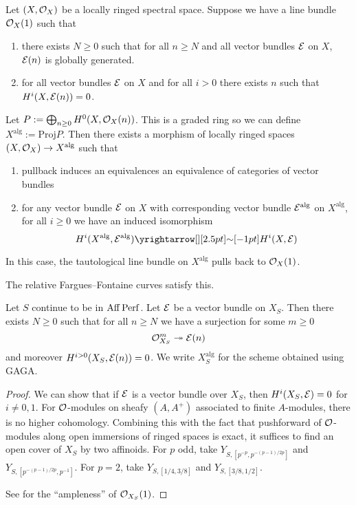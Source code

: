 \documentclass{article}
\begin{document}
\begin{prop}[GAGA]
  
  Let $(X , \mathcal{O}_X)$ be a locally ringed spectral space.
  Suppose we have a line bundle $\mathcal{O}_X(1)$ such that 
  \begin{enumerate}
    \item there exists $N \geq 0$ such that for all $n \geq N$ 
    and all vector bundles $\mathcal{E}$ on $X$, $\mathcal{E}(n)$ is globally generated.
    \item for all vector bundles $\mathcal{E}$ on $X$
    and for all $i > 0$
    there exists $n$ such that $H^i(X , \mathcal{E}(n)) = 0$.
  \end{enumerate}
  Let $P := \bigoplus_{n \geq 0} H^0(X , \mathcal{O}_X(n))$.
  This is a graded ring so we can define 
  $X^{\mathrm{alg}} := \mathrm{Proj} P$.
  Then there exists a morphism of locally ringed spaces
  $(X , \mathcal{O}_X) \to X^{\mathrm{alg}}$ such that 
  \begin{enumerate}
    \item pullback induces an equivalences an equivalence of
    categories of vector bundles
    \item for any vector bundle $\mathcal{E}$ on $X$ with
    corresponding vector bundle $\mathcal{E}^{\mathrm{alg}}$ on $X^{\mathrm{alg}}$,
    for all $i \geq 0$
    we have an induced isomorphism \[
      H^i(X^{\mathrm{alg}}, \cE^{\mathrm{alg}}) \map{\sim}{}
      H^i(X , \cE)
    \]
  \end{enumerate}
  In this case, the tautological line bundle on $X^{\mathrm{alg}}$
  pulls back to $\mathcal{O}_X(1)$.
  \cite[Prop. II.2.7]{FS24}
\end{prop}
The relative Fargues--Fontaine curves satisfy this.
\begin{prop}
  
  Let $S$ continue to be in $\mathrm{Aff}\operatorname{Perf}$.
  Let $\mathcal{E}$ be a vector bundle on $X_S$.
  Then there exists $N \geq 0$ such that for all $n \geq N$
  we have a surjection for some $m \geq 0$
  \[
    \mathcal{O}_{X_S}^m \twoheadrightarrow \mathcal{E}(n)
  \]
  and moreover $H^{i > 0}(X_S , \mathcal{E}(n)) = 0$.
  We write $X_S^{\mathrm{alg}}$ for the scheme
  obtained using GAGA.
\end{prop}
\begin{proof}
  We can show that if $\mathcal{E}$ is a vector bundle over $X_S$,
  then $H^{i}(X_S , \mathcal{E}) = 0$ for $i \neq 0 , 1$.
  For $\mathcal{O}$-modules on sheafy $(A , A^+)$ associated to 
  finite $A$-modules, there is no higher cohomology.
  \cite[Theorem 2.5.20]{KL15}
  Combining this with the fact that pushforward of
  $\mathcal{O}$-modules along open immersions of ringed spaces is exact,
  it suffices to find an open cover of $X_S$ by two affinoids.
  For $p$ odd, take $Y_{S , [p^{-p} , p^{- (p-1) / 2 p}]}$ and 
  $Y_{S , [p^{- (p-1)/2p} , p^{-1}]}$.
  For $p = 2$, take $Y_{S , [1 / 4 , 3 / 8]}$ and $Y_{S , [3 / 8 , 1 / 2]}$.

  See \cite[Theorem II.2.6]{FS24} for the ``ampleness'' of $\mathcal{O}_{X_S}(1)$.
\end{proof}
\end{document}
